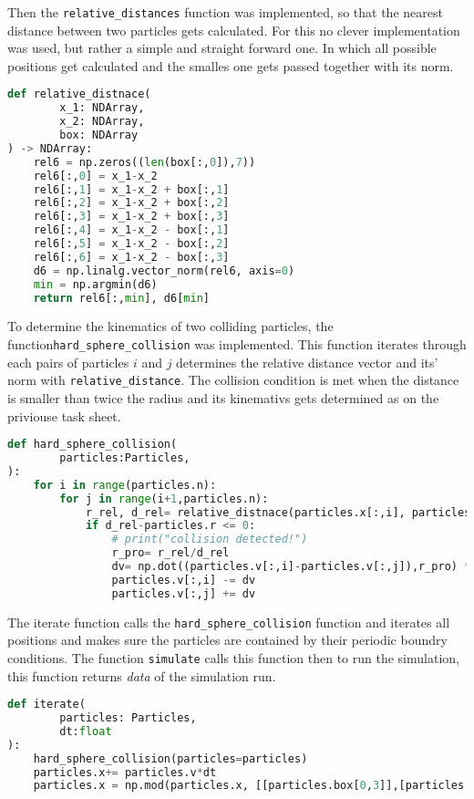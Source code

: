 \documentclass{article}[a4paper]
\begin{document}
Then the \texttt{relative\_distances} function was implemented, so that the nearest distance between two particles gets calculated. 
For this no clever implementation was used, but rather a simple and straight forward one. 
In which all possible positions get calculated and the smalles one gets passed together with its norm.
\begin{lstlisting}[language=Python]
def relative_distnace(
        x_1: NDArray,
        x_2: NDArray,
        box: NDArray
) -> NDArray:
    rel6 = np.zeros((len(box[:,0]),7))
    rel6[:,0] = x_1-x_2 
    rel6[:,1] = x_1-x_2 + box[:,1]
    rel6[:,2] = x_1-x_2 + box[:,2]
    rel6[:,3] = x_1-x_2 + box[:,3]
    rel6[:,4] = x_1-x_2 - box[:,1]
    rel6[:,5] = x_1-x_2 - box[:,2]
    rel6[:,6] = x_1-x_2 - box[:,3]
    d6 = np.linalg.vector_norm(rel6, axis=0)
    min = np.argmin(d6)
    return rel6[:,min], d6[min]
\end{lstlisting}

To determine the kinematics of two colliding particles, the function\newline \texttt{hard\_sphere\_collision} was implemented. 
This function iterates through each pairs of particles $i$ and $j$ determines the relative distance vector and its' norm with \texttt{relative\_distance}. 
The collision condition is met when the distance is smaller than twice the radius and its kinemativs gets determined as on the priviouse task sheet. 
\begin{lstlisting}[language=Python]
def hard_sphere_collision(
        particles:Particles,
):
    for i in range(particles.n):
        for j in range(i+1,particles.n):
            r_rel, d_rel= relative_distnace(particles.x[:,i], particles.x[:,j],particles.box) 
            if d_rel-particles.r <= 0:
                # print("collision detected!")
                r_pro= r_rel/d_rel
                dv= np.dot((particles.v[:,i]-particles.v[:,j]),r_pro) * r_pro
                particles.v[:,i] -= dv
                particles.v[:,j] += dv
\end{lstlisting}

The iterate function calls the \texttt{hard\_sphere\_collision} function and iterates all positions and makes sure the particles are contained by their periodic boundry conditions. The function \texttt{simulate} calls this function then to run the simulation, this function returns \textit{data} of the simulation run.
\begin{lstlisting}[language=Python]
def iterate(
        particles: Particles,
        dt:float
):
    hard_sphere_collision(particles=particles)
    particles.x+= particles.v*dt  
    particles.x = np.mod(particles.x, [[particles.box[0,3]],[particles.box[1,3]]]) 
\end{lstlisting}
\end{document}

